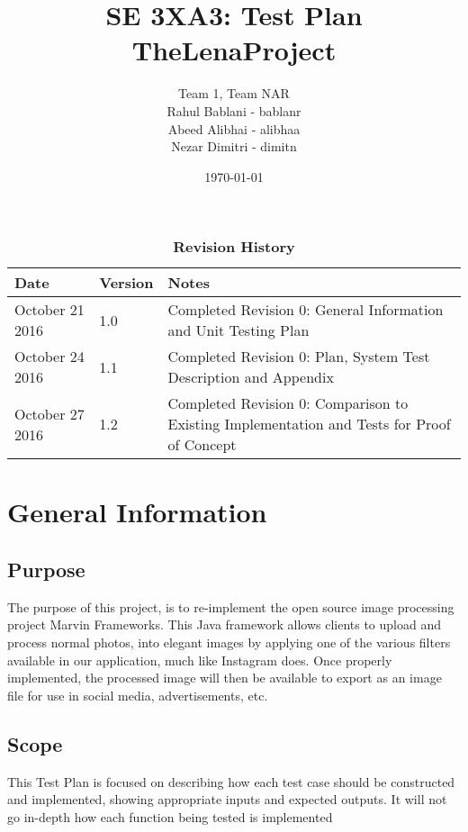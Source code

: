\documentclass[12pt, titlepage]{article}
\title{SE 3XA3: Test Plan\\TheLenaProject}
\author{Team 1, Team NAR
		\\ Rahul Bablani - bablanr
		\\ Abeed Alibhai - alibhaa
		\\ Nezar Dimitri - dimitn
}
\date{\today}
\begin{document}
\maketitle

\tableofcontents
\listoftables

\begin{table}[bp]
\caption{\bf Revision History}
\begin{tabularx}{\textwidth}{p{3cm}p{2cm}X}
\toprule {\bf Date} & {\bf Version} & {\bf Notes}\\
\midrule
October 21 2016 & 1.0 & Completed Revision 0: General Information and Unit Testing Plan\\
October 24 2016 & 1.1 & Completed Revision 0: Plan, System Test Description and Appendix\\
October 27 2016 & 1.2 & Completed Revision 0: Comparison to Existing Implementation and Tests for Proof of Concept\\
\bottomrule
\end{tabularx}
\end{table}

\newpage


\section{General Information}

\subsection{Purpose}

The purpose of this project, is to re-implement the open source image processing project Marvin Frameworks. This Java framework allows clients to upload and process normal photos, into elegant images by applying one of the various filters available in our application, much like Instagram does. Once properly implemented, the processed image will then be available to export as an image file for use in social media, advertisements, etc.

\subsection{Scope}

This Test Plan is focused on describing how each test case should be constructed and implemented, showing appropriate inputs and expected outputs. It will not go in-depth how each function being tested is implemented
\end{document}
